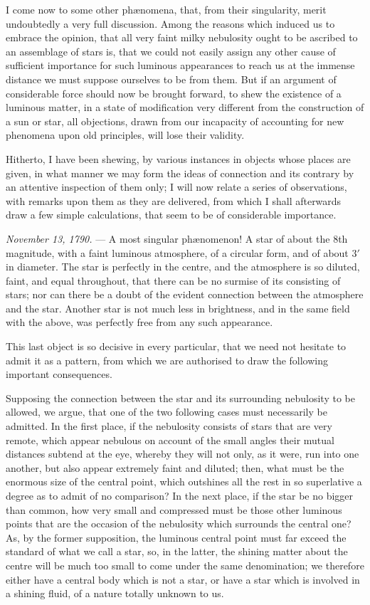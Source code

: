 \documentclass[a4paper, 12pt, oneside, polutonikogreek, english]{article}
\begin{document}
I come now to some other phænomena, that, from their singularity, merit undoubtedly a very full discussion. Among the reasons which induced us to embrace the opinion, that all very faint milky nebulosity ought to be ascribed to an assemblage of stars is, that we could not easily assign any other cause of sufficient importance for such luminous appearances to reach us at the immense distance we must suppose ourselves to be from them. But if an argument of considerable force should now be brought forward, to shew the existence of a luminous matter, in a state of modification very different from the construction of a sun or star, all objections, drawn from our incapacity of accounting for new phenomena upon old principles, will lose their validity.

Hitherto, I have been shewing, by various instances in objects whose places are given, in what manner we may form the ideas of connection and its contrary by an attentive inspection of them only; I will now relate a series of observations, with remarks upon them as they are delivered, from which I shall afterwards draw a few simple calculations, that seem to be of considerable importance.

\emph{November 13, 1790.} --- A most singular phænomenon! A star of about the 8th magnitude, with a faint luminous atmosphere, of a circular form, and of about 3$\prime$ in diameter. The star is perfectly in the centre, and the atmosphere is so diluted, faint, and equal throughout, that there can be no surmise of its consisting of stars; nor can there be a doubt of the evident connection between the atmosphere and the star. Another star is not much less in brightness, and in the same field with the above, was perfectly free from any such appearance.

This last object is so decisive in every particular, that we need not hesitate to admit it as a pattern, from which we are authorised to draw the following important consequences.

Supposing the connection between the star and its surrounding nebulosity to be allowed, we argue, that one of the two following cases must necessarily be admitted. In the first place, if the nebulosity consists of stars that are very remote, which appear nebulous on account of the small angles their mutual distances subtend at the eye, whereby they will not only, as it were, run into one another, but also appear extremely faint and diluted; then, what must be the enormous size of the central point, which outshines all the rest in so superlative a degree as to admit of no comparison? In the next place, if the star be no bigger than common, how very small and compressed must be those other luminous points that are the occasion of the nebulosity which surrounds the central one? As, by the former supposition, the luminous central point must far exceed the standard of what we call a star, so, in the latter, the shining matter about the centre will be much too small to come under the same denomination; we therefore either have a central body which is not a star, or have a star which is involved in a shining fluid, of a nature totally unknown to us.
\end{document}
